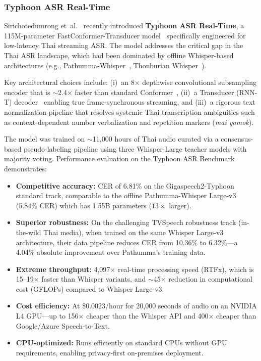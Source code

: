 \documentclass[10pt, a4paper, twocolumn]{article}
\begin{document}
\subsubsection{Typhoon ASR Real-Time}
Sirichotedumrong et~al.~\cite{sirichotedumrong2026typhoonasr} recently introduced \textbf{Typhoon ASR Real-Time}, a 115M-parameter FastConformer-Transducer model~\cite{rekesh2023fastconformer} specifically engineered for low-latency Thai streaming ASR. The model addresses the critical gap in the Thai ASR landscape, which had been dominated by offline Whisper-based architectures (e.g., Pathumma-Whisper~\cite{tipaksorn2024pathumma}, Thonburian Whisper~\cite{aung2024thonburian}).

Key architectural choices include: (i)~an 8$\times$ depthwise convolutional subsampling encoder that is $\sim$2.4$\times$ faster than standard Conformer~\cite{gulati2020conformer}, (ii)~a Transducer (RNN-T) decoder~\cite{graves2012sequence} enabling true frame-synchronous streaming, and (iii)~a rigorous text normalization pipeline that resolves systemic Thai transcription ambiguities such as context-dependent number verbalization and repetition markers (\textit{mai yamok}).

The model was trained on $\sim$11{,}000 hours of Thai audio curated via a consensus-based pseudo-labeling pipeline using three Whisper-Large teacher models with majority voting. Performance evaluation on the Typhoon ASR Benchmark~\cite{sirichotedumrong2026typhoonasr} demonstrates:
\begin{itemize}[nosep]
    \item \textbf{Competitive accuracy:} CER of 6.81\% on the Gigaspeech2-Typhoon standard track, comparable to the offline Pathumma-Whisper Large-v3 (5.84\% CER) which has 1.55B parameters ($13\times$ larger).
    \item \textbf{Superior robustness:} On the challenging TVSpeech robustness track (in-the-wild Thai media), when trained on the same Whisper Large-v3 architecture, their data pipeline reduces CER from 10.36\% to 6.32\%---a 4.04\% absolute improvement over Pathumma's training data.
    \item \textbf{Extreme throughput:} 4{,}097$\times$ real-time processing speed (RTFx), which is 15--19$\times$ faster than Whisper variants, and $\sim$45$\times$ reduction in computational cost (GFLOPs) compared to Whisper Large-v3.
    \item \textbf{Cost efficiency:} At \$0.0023/hour for 20{,}000 seconds of audio on an NVIDIA L4 GPU---up to 156$\times$ cheaper than the Whisper API and 400$\times$ cheaper than Google/Azure Speech-to-Text.
    \item \textbf{CPU-optimized:} Runs efficiently on standard CPUs without GPU requirements, enabling privacy-first on-premises deployment.
\end{itemize}
\end{document}
